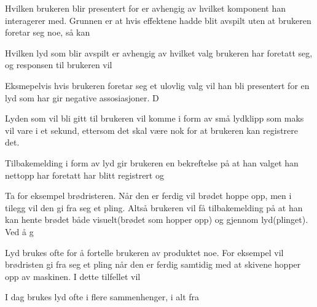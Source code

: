 Hvilken brukeren blir presentert for er avhengig av hvilket komponent han interagerer med.  Grunnen er at hvis effektene hadde blit avspilt uten at brukeren foretar seg noe, så kan


Hvilken lyd som blir avspilt er avhengig av hvilket valg brukeren har foretatt seg, og responsen til brukeren vil 

Eksmepelvis hvis brukeren foretar seg et ulovlig valg vil han bli presentert for en lyd som har gir negative assosiasjoner.  D

Lyden som vil bli gitt til brukeren vil komme i form av små lydklipp som maks vil vare i et sekund,  ettersom det skal være nok for at brukeren kan registrere det. 

 Tilbakemelding i form av lyd gir brukeren en bekreftelse på at han valget han nettopp har foretatt har blitt registrert og 





Ta for eksempel brødristeren. Når den er ferdig vil brødet hoppe opp, men i tilegg vil den gi fra seg et pling. Altså brukeren vil få tilbakemelding på at han kan hente brødet både visuelt(brødet som hopper opp) og gjennom lyd(plinget). Ved å g

Lyd brukes ofte for å fortelle brukeren av produktet noe. For eksempel vil brødristen gi fra seg et pling når den er ferdig samtidig med at skivene hopper opp av maskinen. I dette tilfellet vil 


I dag brukes lyd ofte i flere sammenhenger, i alt fra